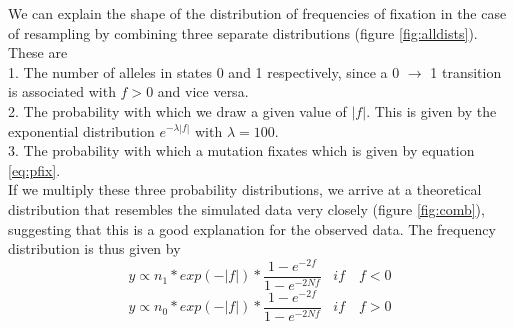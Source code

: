 \documentclass{article}
\begin{document}
We can explain the shape of the distribution of frequencies of fixation in the case of resampling by combining three separate distributions (figure \ref{fig:alldists}). These are\\
1. The number of alleles in states 0 and 1 respectively, since a 0 $\rightarrow$ 1 transition is associated with $f > 0$ and vice versa.\\
2. The probability with which we draw a given value of $|f|$. This is given by the exponential distribution $e^{-\lambda|f|}$ with $\lambda = 100$.\\
3. The probability with which a mutation fixates which is given by equation \ref{eq:pfix}.\\
If we multiply these three probability distributions, we arrive at a theoretical distribution that resembles the simulated data very closely (figure \ref{fig:comb}), suggesting that this is a good explanation for the observed data. The frequency distribution is thus given by
\begin{equation}\label{eq:dist1}
y \propto n_1 * exp(-|f|) * \dfrac{1- e^{-2 f}}{1- e^{-2 N f}} \,\,\,\,\, if \,\,\,\,\,\,  f < 0
\end{equation}
\begin{equation}\label{eq:dist2}
y \propto n_0 * exp(-|f|) * \dfrac{1- e^{-2 f}}{1- e^{-2 N f}}  \,\,\,\,\, if \,\,\,\,\,\, f > 0
\end{equation}
\end{document}
